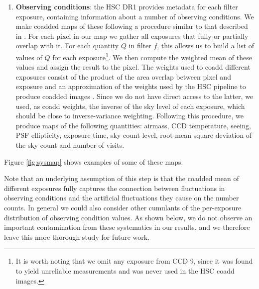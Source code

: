 \documentclass[a4paper,11pt]{article}
\begin{document}
\begin{enumerate}
      \item {\bf Observing conditions}: the HSC DR1 provides metadata for each filter exposure, containing information about a number of observing conditions. We make coadded maps of these following a procedure similar to that described in \cite{2016ApJS..226...24L}. For each pixel in our map we gather all exposures that fully or partially overlap with it. For each quantity $Q$ in filter $f$, this allows us to build a list of values of $Q$ for each exposure\footnote{It is worth noting that we omit any exposure from CCD 9, since it was found to yield unreliable measurements and was never used in the HSC coadd images.}. We then compute the weighted mean of these values and assign the result to the pixel. The weights used to coadd different exposures consist of the product of the area overlap between pixel and exposure and an approximation of the weights used by the HSC pipeline to produce coadded images \cite{2018PASJ...70S...5B}. Since we do not have direct access to the latter, we used, as coadd weights, the inverse of the sky level of each exposure, which should be close to inverse-variance weighting. Following this procedure, we produce maps of the following quantities: airmass, CCD temperature, seeing, PSF ellipticity, exposure time, sky count level, root-mean square deviation of the sky count and number of visits.
    \end{enumerate}
    Figure \ref{fig:sysmap} shows examples of some of these maps.
    
    Note that an underlying assumption of this step is that the coadded mean of different exposures fully captures the connection between fluctuations in observing conditions and the artificial fluctuations they cause on the number counts. In general we could also consider other cumulants of the per-exposure distribution of observing condition values. As shown below, we do not observe an important contamination from these systematics in our results, and we therefore leave this more thorough study for future work.
\end{document}
